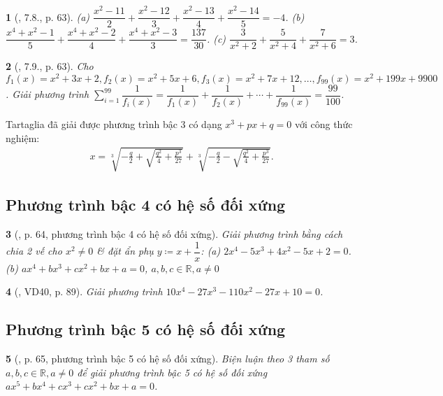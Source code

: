 \documentclass{article}
\newtheorem{baitoan}{}
\begin{document}
\begin{baitoan}[\cite{Binh_boi_duong_Toan_9_tap_2}, 7.8., p. 63]
	(a) $\dfrac{x^2 - 11}{2} + \dfrac{x^2 - 12}{3} + \dfrac{x^2 - 13}{4} + \dfrac{x^2 - 14}{5} = -4$. (b) $\dfrac{x^4 + x^2 - 1}{5} + \dfrac{x^4 + x^2 - 2}{4} + \dfrac{x^4 + x^2 - 3}{3} = \dfrac{137}{30}$. (c) $\dfrac{3}{x^2 + 2} + \dfrac{5}{x^2 + 4} + \dfrac{7}{x^2 + 6} = 3$.
\end{baitoan}

\begin{baitoan}[\cite{Binh_boi_duong_Toan_9_tap_2}, 7.9., p. 63]
	Cho $f_1(x) = x^2 + 3x + 2,f_2(x) = x^2 + 5x + 6,f_3(x) = x^2 + 7x + 12,\ldots,f_{99}(x) = x^2 + 199x + 9900$. Giải phương trình $\sum_{i=1}^{99} \dfrac{1}{f_i(x)} = \dfrac{1}{f_1(x)} + \dfrac{1}{f_2(x)} + \cdots + \dfrac{1}{f_{99}(x)} = \dfrac{99}{100}$.
\end{baitoan}
Tartaglia đã giải được phương trình bậc 3 có dạng $x^3 + px + q = 0$ với công thức nghiệm:
\begin{align*}
	x = \sqrt[3]{-\frac{q}{2} + \sqrt{\frac{q^2}{4} + \frac{p^3}{27}}} + \sqrt[3]{-\frac{q}{2} - \sqrt{\frac{q^2}{4} + \frac{p^3}{27}}}.
\end{align*}

\subsection{Phương trình bậc 4 có hệ số đối xứng}

\begin{baitoan}[\cite{Binh_boi_duong_Toan_9_tap_2}, p. 64, phương trình bậc 4 có hệ số đối xứng]
	Giải phương trình bằng cách chia 2 vế cho $x^2\ne0$ \& đặt ẩn phụ $y\coloneqq x + \dfrac{1}{x}$: (a) $2x^4 - 5x^3 + 4x^2 - 5x + 2 = 0$. (b) $ax^4 + bx^3 + cx^2 + bx + a = 0$, $a,b,c\in\mathbb{R},a\ne0$
\end{baitoan}

\begin{baitoan}[\cite{Tuyen_Toan_9_old}, VD40, p. 89]
	Giải phương trình $10x^4 - 27x^3 - 110x^2 - 27x + 10 = 0$.
\end{baitoan}

\subsection{Phương trình bậc 5 có hệ số đối xứng}

\begin{baitoan}[\cite{Binh_boi_duong_Toan_9_tap_2}, p. 65, phương trình bậc 5 có hệ số đối xứng]
	Biện luận theo 3 tham số $a,b,c\in\mathbb{R},a\ne0$ để giải phương trình bậc 5 có hệ số đối xứng $ax^5 + bx^4 + cx^3 + cx^2 + bx + a = 0$.
\end{baitoan}
\end{document}
